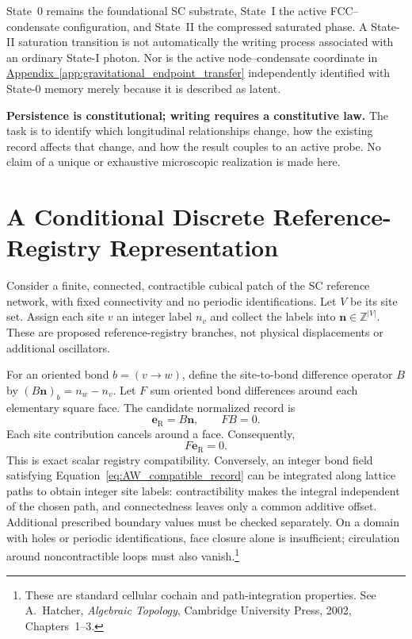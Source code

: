 State~0 remains the foundational SC substrate, State~I the active FCC--condensate configuration, and State~II the compressed saturated phase. A State-II saturation transition is not automatically the writing process associated with an ordinary State-I photon. Nor is the active node--condensate coordinate in \hyperref[app:gravitational_endpoint_transfer]{Appendix~\ref*{app:gravitational_endpoint_transfer}} independently identified with State-0 memory merely because it is described as latent.

\noindent\textbf{Persistence is constitutional; writing requires a constitutive law.}
The task is to identify which longitudinal relationships change, how the existing record affects that change, and how the result couples to an active probe. No claim of a unique or exhaustive microscopic realization is made here.

\section{A Conditional Discrete Reference-Registry Representation}
\label{sec:AW_registry_representation}

Consider a finite, connected, contractible cubical patch of the SC reference network, with fixed connectivity and no periodic identifications. Let $V$ be its site set. Assign each site $v$ an integer label $n_v$ and collect the labels into $\mathbf n\in\mathbb Z^{|V|}$. These are proposed reference-registry branches, not physical displacements or additional oscillators.

For an oriented bond $b=(v\to w)$, define the site-to-bond difference operator $B$ by $(B\mathbf n)_b=n_w-n_v$. Let $F$ sum oriented bond differences around each elementary square face. The candidate normalized record is
\begin{equation}
    \mathbf e_{\mathrm R}=B\mathbf n,
    \qquad
    FB=0.
    \label{eq:AW_registry_gradient}
\end{equation}
Each site contribution cancels around a face. Consequently,
\begin{equation}
    F\mathbf e_{\mathrm R}=0.
    \label{eq:AW_compatible_record}
\end{equation}
This is exact scalar registry compatibility. Conversely, an integer bond field satisfying Equation~\eqref{eq:AW_compatible_record} can be integrated along lattice paths to obtain integer site labels: contractibility makes the integral independent of the chosen path, and connectedness leaves only a common additive offset. Additional prescribed boundary values must be checked separately. On a domain with holes or periodic identifications, face closure alone is insufficient; circulation around noncontractible loops must also vanish.\footnote{These are standard cellular cochain and path-integration properties. See A.~Hatcher, \emph{Algebraic Topology}, Cambridge University Press, 2002, Chapters~1--3.}

